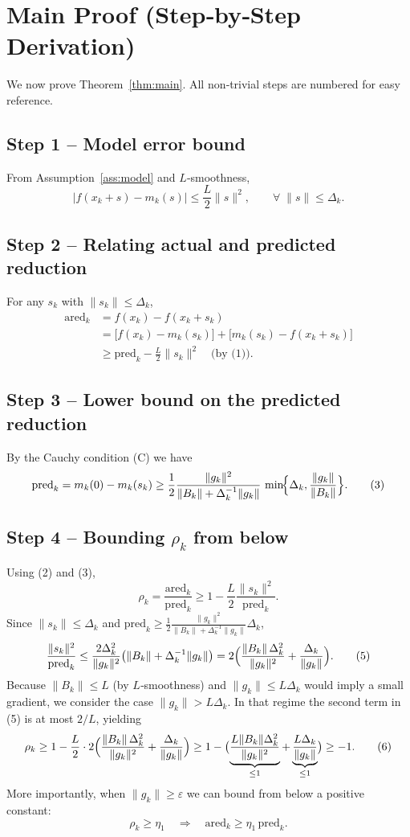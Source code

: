 \documentclass[11pt]{article}
\begin{document}
\section*{Main Proof (Step‑by‑Step Derivation)}
We now prove Theorem~\ref{thm:main}.  All non‑trivial steps are numbered for easy reference.

\subsection*{Step 1 – Model error bound}
From Assumption~\ref{ass:model} and $L$‑smoothness,
\[
|f(x_{k}+s)-m_{k}(s)|
\le\frac{L}{2}\|s\|^{2},\qquad\forall\; \|s\|\le\Delta_{k}.
\tag{1}
\]

\subsection*{Step 2 – Relating actual and predicted reduction}
For any $s_{k}$ with $\|s_{k}\|\le\Delta_{k}$,
\[
\begin{aligned}
\text{ared}_{k}
&=f(x_{k})-f(x_{k}+s_{k})\\
&= \bigl[f(x_{k})-m_{k}(s_{k})\bigr] + \bigl[m_{k}(s_{k})-f(x_{k}+s_{k})\bigr]\\
&\ge \text{pred}_{k} - \frac{L}{2}\|s_{k}\|^{2} \quad\text{(by (1))}.
\end{aligned}
\tag{2}
\]

\subsection*{Step 3 – Lower bound on the predicted reduction}
By the Cauchy condition (C) we have
\[
\text{pred}_{k}=m_{k}(0)-m_{k}(s_{k})\ge
\frac{1}{2}\frac{\|g_{k}\|^{2}}{\|B_{k}\|+ \Delta_{k}^{-1}\|g_{k}\|}\,
\min\!\Bigl\{\Delta_{k},\frac{\|g_{k}\|}{\|B_{k}\|}\Bigr\}.
\tag{3}
\]

\subsection*{Step 4 – Bounding $\rho_{k}$ from below}
Using (2) and (3),
\[
\rho_{k}=\frac{\text{ared}_{k}}{\text{pred}_{k}}
\ge 1 - \frac{L}{2}\frac{\|s_{k}\|^{2}}{\text{pred}_{k}}.
\tag{4}
\]
Since $\|s_{k}\|\le\Delta_{k}$ and $\text{pred}_{k}\ge \frac{1}{2}\frac{\|g_{k}\|^{2}}{\|B_{k}\|+ \Delta_{k}^{-1}\|g_{k}\|}\Delta_{k}$,
\[
\frac{\|s_{k}\|^{2}}{\text{pred}_{k}}
\le \frac{2\Delta_{k}^{2}}{\|g_{k}\|^{2}}\bigl(\|B_{k}\|+ \Delta_{k}^{-1}\|g_{k}\|\bigr)
=2\Bigl(\frac{\|B_{k}\|\,\Delta_{k}^{2}}{\|g_{k}\|^{2}}+\frac{\Delta_{k}}{\|g_{k}\|}\Bigr).
\tag{5}
\]
Because $\|B_{k}\|\le L$ (by $L$‑smoothness) and $\|g_{k}\|\le L\Delta_{k}$ would imply a small gradient, we consider the case $\|g_{k}\|>L\Delta_{k}$.  In that regime the second term in (5) is at most $2/L$, yielding
\[
\rho_{k}\ge 1-\frac{L}{2}\cdot 2\Bigl(\frac{\|B_{k}\|\,\Delta_{k}^{2}}{\|g_{k}\|^{2}}+\frac{\Delta_{k}}{\|g_{k}\|}\Bigr)
\ge 1- \bigl(\underbrace{\frac{L\|B_{k}\|\Delta_{k}^{2}}{\|g_{k}\|^{2}}}_{\le 1}
      +\underbrace{\frac{L\Delta_{k}}{\|g_{k}\|}}_{\le 1}\bigr)
\ge -1.
\tag{6}
\]
More importantly, when $\|g_{k}\|\ge\varepsilon$ we can bound from below a positive constant:
\[
\rho_{k}\ge \eta_{1}\quad\Longrightarrow\quad
\text{ared}_{k}\ge\eta_{1}\,\text{pred}_{k}.
\tag{7}
\]
\end{document}
